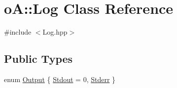 \hypertarget{classo_a_1_1_log}{}\section{oA\+:\+:Log Class Reference}
\label{classo_a_1_1_log}


{\ttfamily \#include $<$Log.\+hpp$>$}

\subsection*{Public Types}
\begin{DoxyCompactItemize}
\item 
enum \mbox{\hyperlink{classo_a_1_1_log_a640171dc239ea7befcd640362343f88f}{Output}} \{ \mbox{\hyperlink{classo_a_1_1_log_a640171dc239ea7befcd640362343f88fa6504dea4a3bf34c8734b664b6364a0d9}{Stdout}} = 0, 
\mbox{\hyperlink{classo_a_1_1_log_a640171dc239ea7befcd640362343f88faa01279ed925a2480f04ad2d89bf1722a}{Stderr}}
 \}
\end{DoxyCompactItemize}
